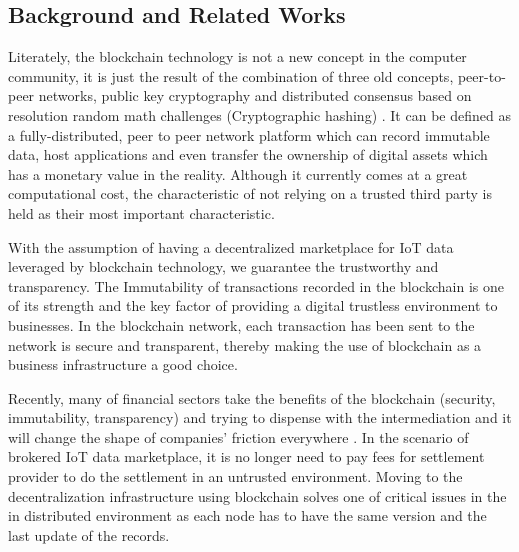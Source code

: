 \documentclass[letterpaper, 10 pt, conference]{ieeeconf}  %
\begin{document}

\subsection{Background and Related Works} \label{RelatedWork&Background}

Literately, the blockchain technology is not a new concept in the computer community, it is just the result of the combination of three old concepts, peer-to-peer networks, public key cryptography and distributed consensus based on resolution random math challenges (Cryptographic hashing) \cite{2}. It can be defined as a fully-distributed, peer to peer network platform which can record immutable data, host applications \cite{2} and even transfer the ownership of digital assets which has a monetary value in the reality. Although it currently comes at a great computational cost, the characteristic of not relying on a trusted third party is held as their most important characteristic.

With the assumption of having a decentralized marketplace for IoT data leveraged by blockchain technology, we guarantee the trustworthy and transparency. The Immutability of transactions recorded in the blockchain is one of its strength and the key factor of providing a digital trustless environment to businesses. In the blockchain network, each transaction has been sent to the network is secure and transparent, thereby making the use of blockchain as a business infrastructure a good choice.

Recently, many of financial sectors take the benefits of the blockchain (security, immutability, transparency) and trying to dispense with the intermediation and it will change the shape of companies’ friction everywhere \cite{2}\cite{9}\cite{10}. In the scenario of brokered IoT data marketplace, it is no longer need to pay fees for settlement provider to do the settlement in an untrusted environment. Moving to the decentralization infrastructure using blockchain solves one of critical issues in the in distributed environment as each node has to have the same version and the last update of the records.
\end{document}
